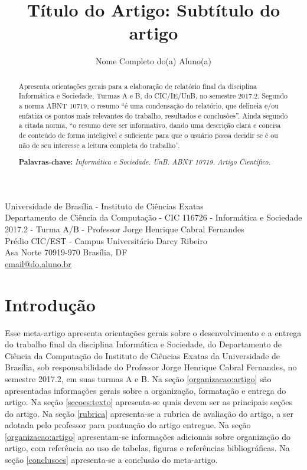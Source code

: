 \documentclass[12pt]{article}
\begin{document}
 
	\title{Título do Artigo: Subtítulo do artigo}
	
	\author{Nome Completo do(a) Aluno(a)}
	
	\renewcommand{\tablename}{Quadro}
	
	\newcommand{\address}{{
			\begin{center}
				\footnotesize
				Universidade de Brasília - Instituto de Ciências Exatas\\  Departamento de Ciência da Computação - CIC 116726 - Informática e Sociedade \\
				2017.2 - Turma A/B - Professor Jorge Henrique Cabral Fernandes\\ Prédio CIC/EST - Campus Universitário Darcy Ribeiro \\Asa Norte 70919-970 Brasília, DF\\
				\href{mailto:email@do.aluno.br}{email@do.aluno.br}
			\end{center}
	}}
	
	\maketitle
	\address
	
	\begin{abstract} 
		Apresenta orientações gerais para a elaboração de relatório final da disciplina Informática e Sociedade, Turmas A e B, do CIC/IE/UnB, no semestre 2017.2. Segundo a norma ABNT 10719, o resumo ``é uma condensação do relatório, que delineia e/ou enfatiza os pontos mais relevantes do trabalho, resultados e conclusões''. Ainda segundo a citada norma, ``o resumo deve ser informativo, dando uma descrição clara e concisa de conteúdo de forma inteligível e suficiente para que o usuário possa decidir se é ou não de seu interesse a leitura completa do trabalho''.
		
		\textbf{Palavras-chave:} \textit{Informática e Sociedade. UnB. ABNT 10719. Artigo Científico.}
	\end{abstract}
	
	\section{Introdução}
	
	Esse meta-artigo apresenta orientações gerais sobre o desenvolvimento e a entrega do trabalho final da disciplina Informática e Sociedade, do Departamento de Ciência da Computação do Instituto de Ciências Exatas da Universidade de Brasília, sob responsabilidade do Professor Jorge Henrique Cabral Fernandes, no semestre 2017.2, em suas turmas A e B. 
	Na seção \ref{organizacao:artigo} são apresentadas informações gerais sobre a organização, formatação e entrega do artigo. 
	Na seção \ref{secoes:texto} apresenta-se quais devem ser as principais seções do artigo. 
	Na seção \ref{rubrica} apresenta-se a rubrica de avaliação do artigo, a ser adotada pelo professor para pontuação do artigo entregue. 
	Na seção \ref{organizacao:artigo} apresentam-se informações adicionais sobre organização do artigo, com referência ao uso de tabelas, figuras e referências bibliográficas. 
	Na seção \ref{conclusoes} apresenta-se a conclusão do meta-artigo.
	
\end{document}
